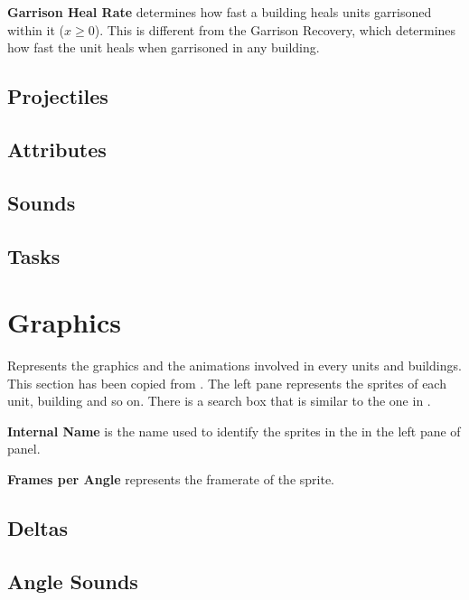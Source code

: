 \begin{appendices}
    \textbf{Garrison Heal Rate} determines how fast a building heals units garrisoned within it ($x \geq 0$). This is different from the Garrison Recovery, which determines how fast the unit heals when garrisoned in any building\cite{agewiki:2014}.

    \subsection{Projectiles}

    \subsection{Attributes}

    \subsection{Sounds}

    \subsection{Tasks}

    \section{Graphics}

    Represents the graphics and the animations involved in every units and buildings. This section has been copied from \cite{agewiki:grpahics:2014}. The left pane represents the sprites of each unit, building and so on. There is a search box that is similar to the one in .

    \textbf{Internal Name} is the name used to identify the sprites in the \genie{} in the left pane of  panel.

    \textbf{Frames per Angle} represents the framerate of the sprite.

    \subsection{Deltas}

    \subsection{Angle Sounds}

    

\end{appendices}